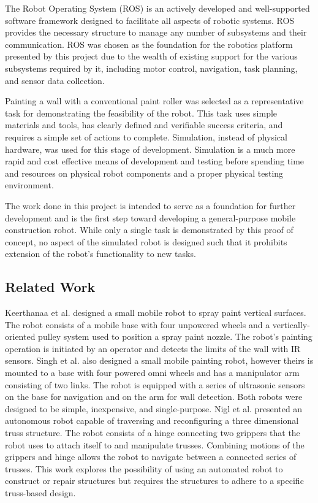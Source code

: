 The Robot Operating System (ROS) \cite{ros_melodic} is an actively developed and well-supported software framework designed to facilitate all aspects of robotic systems. ROS provides the necessary structure to manage any number of subsystems and their communication. ROS was chosen as the foundation for the robotics platform presented by this project due to the wealth of existing support for the various subsystems required by it, including motor control, navigation, task planning, and sensor data collection.

Painting a wall with a conventional paint roller was selected as a representative task for demonstrating the feasibility of the robot. This task uses simple materials and tools, has clearly defined and verifiable success criteria, and requires a simple set of actions to complete. Simulation, instead of physical hardware, was used for this stage of development. Simulation is a much more rapid and cost effective means of development and testing before spending time and resources on physical robot components and a proper physical testing environment.

The work done in this project is intended to serve as a foundation for further development and is the first step toward developing a general-purpose mobile construction robot. While only a single task is demonstrated by this proof of concept, no aspect of the simulated robot is designed such that it prohibits extension of the robot's functionality to new tasks.

\subsection{Related Work}
Keerthanaa et al. \cite{keerthanaa2013automatic} designed a small mobile robot to spray paint vertical surfaces. The robot consists of a mobile base with four unpowered wheels and a vertically-oriented pulley system used to position a spray paint nozzle. The robot's painting operation is initiated by an operator and detects the limits of the wall with IR sensors. Singh et al. \cite{singh2018arduino} also designed a small mobile painting robot, however theirs is mounted to a base with four powered omni wheels and has a manipulator arm consisting of two links. The robot is equipped with a series of ultrasonic sensors on the base for navigation and on the arm for wall detection. Both robots were designed to be simple, inexpensive, and single-purpose. Nigl et al. \cite{nigl2013structure} presented an autonomous robot capable of traversing and reconfiguring a three dimensional truss structure. The robot consists of a hinge connecting two grippers that the robot uses to attach itself to and manipulate trusses. Combining motions of the grippers and hinge allows the robot to navigate between a connected series of trusses. This work explores the possibility of using an automated robot to construct or repair structures but requires the structures to adhere to a specific truss-based design.

